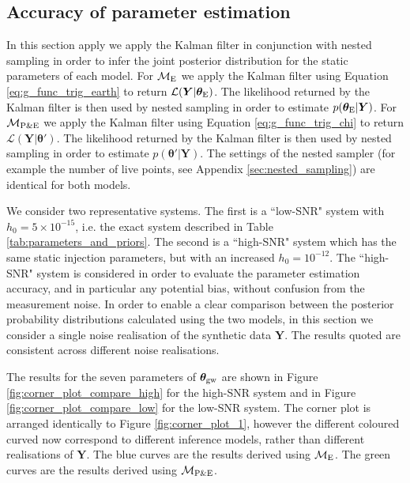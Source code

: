 \documentclass[fleqn,usenatbib,useAMS]{mnras}
\begin{document}
\subsection{Accuracy of parameter estimation}\label{sec:psr_v_earth_pe}

In this section apply we apply the Kalman filter in conjunction with nested sampling in order to infer the joint posterior distribution for the static parameters of each model. For $\mathcal{M}_{\rm E}$ we apply the Kalman filter using Equation \eqref{eq:g_func_trig_earth} to return $\mathcal{L}(\boldsymbol{Y}| \boldsymbol{\theta}_{\rm E})$. The likelihood returned by the Kalman filter is then used by nested sampling in order to estimate $p(\boldsymbol{\theta}_{\rm E} | \boldsymbol{Y})$. For $\mathcal{M}_{\rm P \& E}$ we apply the Kalman filter using Equation \eqref{eq:g_func_trig_chi} to return $\mathcal{L}(\boldsymbol{Y}| \boldsymbol{\theta}')$. The likelihood returned by the Kalman filter is then used by nested sampling in order to estimate $p(\boldsymbol{\theta'} | \boldsymbol{Y})$. The settings of the nested sampler (for example the number of live points, see Appendix \ref{sec:nested_sampling}) are identical for both models. \newline 

We consider two representative systems. The first is a ``low-SNR" system with $h_0 = 5 \times 10^{-15}$, i.e. the exact system described in Table \ref{tab:parameters_and_priors}. The second is a ``high-SNR" system which has the same static injection parameters, but with an increased $h_0 = 10^{-12}$. The ``high-SNR" system is considered in order to evaluate the parameter estimation accuracy, and in particular any potential bias, without confusion from the measurement noise. In order to enable a clear comparison between the posterior probability distributions calculated using the two models, in this section we consider a single noise realisation of the synthetic data $\boldsymbol{Y}$. The results quoted are consistent across different noise realisations. \newline 


The results for the seven parameters of  $\boldsymbol{\theta}_{\rm gw}$ are shown in Figure \ref{fig:corner_plot_compare_high} for the high-SNR system and in Figure \ref{fig:corner_plot_compare_low} for the low-SNR system. The corner plot is arranged identically to Figure \ref{fig:corner_plot_1}, however the different coloured curved now correspond to different inference models, rather than different realisations of $\boldsymbol{Y}$. The blue curves are the results derived using $\mathcal{M}_{\rm E}$. The green curves are the results derived using $\mathcal{M}_{\rm P \& E}$. \newline 
		
\end{document}
